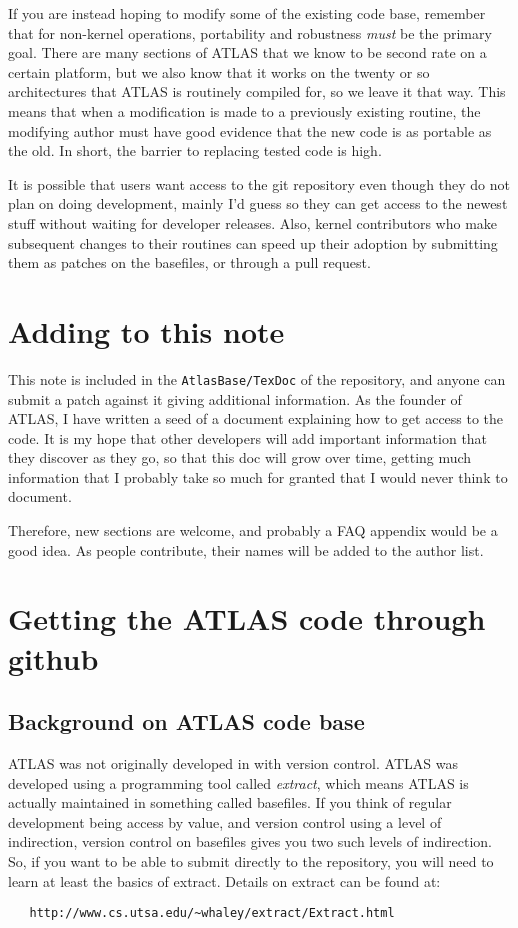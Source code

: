 \documentclass[11pt]{article}
\begin{document}
If you are instead hoping to modify some of the existing code base, remember
that for non-kernel operations, portability and robustness {\em must} be
the primary goal.  There are many sections of ATLAS that we know to be
second rate on a certain platform, but we also know that it works on the
twenty or so architectures that ATLAS is routinely compiled for, so we leave
it that way.  This means that when a modification is made to a previously
existing routine, the modifying author must have good evidence that
the new code is as portable as the old.  In short, the barrier to replacing
tested code is high.

It is possible that users want access to the git repository even though they
do not plan on doing development, mainly I'd guess so they can get access
to the newest stuff without waiting for developer releases.  Also,
kernel contributors who make subsequent changes to their routines can speed up
their adoption by submitting them as patches on the basefiles, or through
a pull request.

\section{Adding to this note}
This note is included in the {\tt AtlasBase/TexDoc} of the repository,
and anyone can submit a patch against it giving additional information.
As the founder of ATLAS, I have written a seed of a document explaining
how to get access to the code.  It is my hope that other developers will
add important information that they discover as they go, so that this doc
will grow over time, getting much information that I probably take so much
for granted that I would never think to document.

Therefore, new sections are welcome, and probably a FAQ appendix would
be a good idea.  As people contribute, their names will be added to the
author list.

\section{Getting the ATLAS code through github}

\subsection{Background on ATLAS code base}

ATLAS was not originally developed in with version control.  
ATLAS was developed using a
programming tool called {\em extract}, which means ATLAS is actually
maintained in something called basefiles.  If you think
of regular development being access by value, and version control using a
level of indirection, version control on basefiles gives you two such levels
of indirection.  So, if you want to be able to submit directly to the 
repository, you will need to learn at least
the basics of extract.  Details on extract can be found at:
\begin{verbatim}
   http://www.cs.utsa.edu/~whaley/extract/Extract.html
\end{verbatim}
\end{document}
